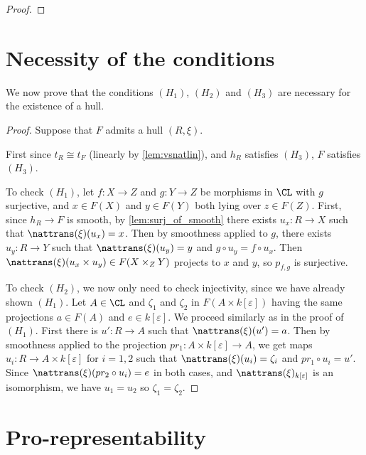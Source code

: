 \begin{proof}
\end{proof}

\section{Necessity of the conditions}
\label{necessityoftheconditions}

We now prove that the conditions $(H_1)$, $(H_2)$ and $(H_3)$
are necessary for the existence of a hull.

\begin{proof}
  Suppose that $F$ admits a hull $(R, \xi)$.

  First since $t_R \cong t_F$ (linearly by \cref{lem:vsnatlin}),
  and $h_R$ satisfies $(H_3)$, $F$ satisfies $(H_3)$.

  To check $(H_1)$, let $f : X \to Z$ and $g : Y \to Z$ be morphisms
  in $\CL$ with $g$ surjective, and $x \in F(X)$ and $y \in F(Y)$
  both lying over $z \in F(Z)$. First, since $h_R \to F$ is smooth,
  by \cref{lem:surj_of_smooth} there exists $u_x : R \to X$ such that
  $\nattrans(\xi) (u_x) = x$. Then by smoothness applied to $g$,
  there exists $u_y : R \to Y$ such that $\nattrans(\xi) (u_y) = y$
  and $g \circ u_y = f \circ u_x$.
  Then $\nattrans(\xi)(u_x \times u_y) \in F(X \times_Z Y)$
  projects to $x$ and $y$, so $p_{f, g}$ is surjective.

  To check $(H_2)$, we now only need to check injectivity, since
  we have already shown $(H_1)$.
  Let $A \in \CL$ and $\zeta_1$ and $\zeta_2$ in
  $F(A \times k[\varepsilon])$ having the same projections $a \in F(A)$
  and $e \in k[\varepsilon]$.
  We proceed similarly as in the proof of $(H_1)$.
  First there is $u' : R \to A$ such that $\nattrans(\xi) (u') = a$.
  Then by smoothness applied to the projection
  $pr_1 : A \times k[\varepsilon] \to A$, we get maps
  $u_i : R \to A \times k[\varepsilon]$ for $i = 1, 2$ such that
  $\nattrans(\xi) (u_i) = \zeta_i$ and $pr_1 \circ u_i = u'$.
  Since $\nattrans(\xi) (pr_2 \circ u_i) = e$ in both cases,
  and $\nattrans(\xi)_{k[\varepsilon]}$ is an isomorphism,
  we have $u_1 = u_2$ so $\zeta_1 = \zeta_2$.

\end{proof}

\section{Pro-representability}

